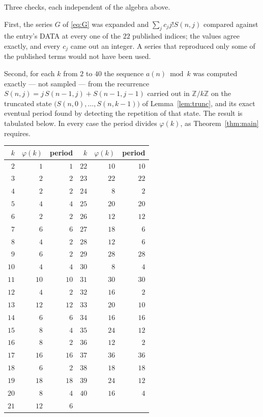 \documentclass[11pt,a4paper]{article}
\theoremstyle{plain}
\theoremstyle{definition}
\begin{document}
Three checks, each independent of the algebra above.

First, the series $G$ of \eqref{eq:G} was expanded and $\sum_j c_j j! S(n,j)$ compared
against the entry's DATA at every one of the $22$ published indices; the values
agree exactly, and every $c_j$ came out an integer. A series that reproduced only some of
the published terms would not have been used.

Second, for each $k$ from $2$ to $40$ the sequence $a(n)\bmod k$ was computed exactly
--- not sampled --- from the recurrence $S(n,j)=j\,S(n-1,j)+S(n-1,j-1)$ carried out in
$\mathbb{Z}/k\mathbb{Z}$ on the truncated state
$\bigl(S(n,0),\dots,S(n,k-1)\bigr)$ of Lemma~\ref{lem:trunc}, and its exact eventual
period found by detecting the repetition of that state. The result is tabulated below.
In every case the period divides $\varphi(k)$, as Theorem~\ref{thm:main} requires.

\begin{center}\small
\begin{tabular}{rrr@{\qquad\qquad}rrr}
$k$ & $\varphi(k)$ & period & $k$ & $\varphi(k)$ & period \\ \hline
$2$ & $1$ & $1$ & $22$ & $10$ & $10$ \\
$3$ & $2$ & $2$ & $23$ & $22$ & $22$ \\
$4$ & $2$ & $2$ & $24$ & $8$ & $2$ \\
$5$ & $4$ & $4$ & $25$ & $20$ & $20$ \\
$6$ & $2$ & $2$ & $26$ & $12$ & $12$ \\
$7$ & $6$ & $6$ & $27$ & $18$ & $6$ \\
$8$ & $4$ & $2$ & $28$ & $12$ & $6$ \\
$9$ & $6$ & $2$ & $29$ & $28$ & $28$ \\
$10$ & $4$ & $4$ & $30$ & $8$ & $4$ \\
$11$ & $10$ & $10$ & $31$ & $30$ & $30$ \\
$12$ & $4$ & $2$ & $32$ & $16$ & $2$ \\
$13$ & $12$ & $12$ & $33$ & $20$ & $10$ \\
$14$ & $6$ & $6$ & $34$ & $16$ & $16$ \\
$15$ & $8$ & $4$ & $35$ & $24$ & $12$ \\
$16$ & $8$ & $2$ & $36$ & $12$ & $2$ \\
$17$ & $16$ & $16$ & $37$ & $36$ & $36$ \\
$18$ & $6$ & $2$ & $38$ & $18$ & $18$ \\
$19$ & $18$ & $18$ & $39$ & $24$ & $12$ \\
$20$ & $8$ & $4$ & $40$ & $16$ & $4$ \\
$21$ & $12$ & $6$ &  & & \\
\end{tabular}
\end{center}
\end{document}
